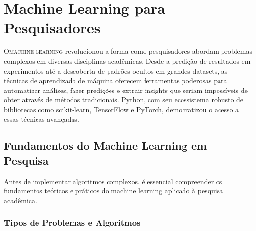 
\chapter{Machine Learning para Pesquisadores}

\lettrine{O}{machine learning} revolucionou a forma como pesquisadores abordam problemas complexos em diversas disciplinas acadêmicas. Desde a predição de resultados em experimentos até a descoberta de padrões ocultos em grandes datasets, as técnicas de aprendizado de máquina oferecem ferramentas poderosas para automatizar análises, fazer predições e extrair insights que seriam impossíveis de obter através de métodos tradicionais. Python, com seu ecossistema robusto de bibliotecas como scikit-learn, TensorFlow e PyTorch, democratizou o acesso a essas técnicas avançadas.

\section{Fundamentos do Machine Learning em Pesquisa}

Antes de implementar algoritmos complexos, é essencial compreender os fundamentos teóricos e práticos do machine learning aplicado à pesquisa acadêmica.

\subsection{Tipos de Problemas e Algoritmos}

